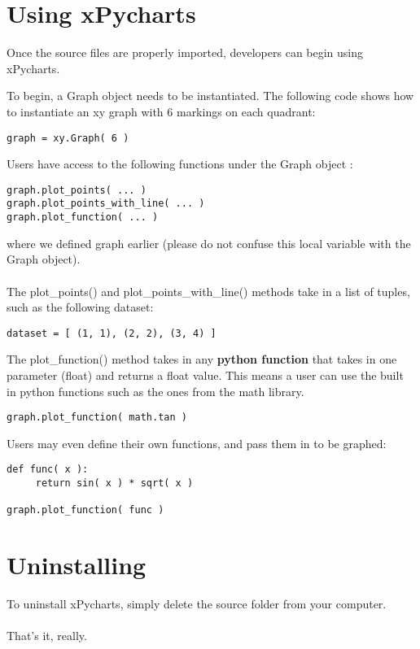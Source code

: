 \documentclass{article}
\begin{document}
\section{Using xPycharts}
Once the source files are properly imported, developers can begin using xPycharts.

To begin, a Graph object needs to be instantiated. The following code shows how to instantiate an xy graph with 6 markings on each quadrant:
\begin{verbatim}
graph = xy.Graph( 6 )
\end{verbatim}

Users have access to the following functions under the Graph object :
\begin{verbatim}
graph.plot_points( ... )
graph.plot_points_with_line( ... )
graph.plot_function( ... )
\end{verbatim}
where we defined graph earlier (please do not confuse this local variable with the Graph object). \\\\
The plot\_points() and plot\_points\_with\_line() methods take in a list of tuples, such as the following dataset:
\begin{verbatim}
dataset = [ (1, 1), (2, 2), (3, 4) ]
\end{verbatim} 
The plot\_function() method takes in any \textbf{python function} that takes in one parameter (float) and returns a float value. This means a user can use the built in python functions such as the ones from the math library. 
\begin{verbatim}
graph.plot_function( math.tan )
\end{verbatim} 
Users may even define their own functions, and pass them in to be graphed:

\begin{verbatim}
def func( x ):
     return sin( x ) * sqrt( x )

graph.plot_function( func )
\end{verbatim} 

\section{Uninstalling}
To uninstall xPycharts, simply delete the source folder from your computer. \\\\That's it, really. 
\end{document}
